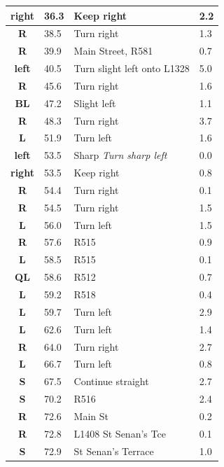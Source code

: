 \documentclass[11pt]{article}
\begin{document}
\begin{center}
\begin{supertabular}{|c|p{0.30in}|p{2.25in}|l|}
 \textbf{right} &  36.3 & Keep right &   2.2 \\ \hline
{} \textbf{R} &  38.5 & Turn right &   1.3 \\ \hline
{} \textbf{R} &  39.9 & Main Street, R581 &   0.7 \\ \hline
 \textbf{left} &  40.5 & Turn slight left onto L1328 &   5.0 \\ \hline
{} \textbf{R} &  45.6 & Turn right &   1.6 \\ \hline
 \textbf{BL} &  47.2 & Slight left &   1.1 \\ \hline
{} \textbf{R} &  48.3 & Turn right &   3.7 \\ \hline
 \textbf{L} &  51.9 & Turn left &   1.6 \\ \hline
 \textbf{left} &  53.5 & Sharp \newline \textit{Turn sharp left} &   0.0 \\ \hline
 \textbf{right} &  53.5 & Keep right &   0.8 \\ \hline
{} \textbf{R} &  54.4 & Turn right &   0.1 \\ \hline
{} \textbf{R} &  54.5 & Turn right &   1.5 \\ \hline
 \textbf{L} &  56.0 & Turn left &   1.5 \\ \hline
{} \textbf{R} &  57.6 & R515 &   0.9 \\ \hline
 \textbf{L} &  58.5 & R515 &   0.1 \\ \hline
 \textbf{QL} &  58.6 & R512 &   0.7 \\ \hline
 \textbf{L} &  59.2 & R518 &   0.4 \\ \hline
 \textbf{L} &  59.7 & Turn left &   2.9 \\ \hline
 \textbf{L} &  62.6 & Turn left &   1.4 \\ \hline
{} \textbf{R} &  64.0 & Turn right &   2.7 \\ \hline
 \textbf{L} &  66.7 & Turn left &   0.8 \\ \hline
 \textbf{S} &  67.5 & Continue straight &   2.7 \\ \hline
 \textbf{S} &  70.2 & R516 &   2.4 \\ \hline
{} \textbf{R} &  72.6 & Main St &   0.2 \\ \hline
{} \textbf{R} &  72.8 & L1408 St Senan's Tce &   0.1 \\ \hline
 \textbf{S} &  72.9 & St Senan's Terrace &   1.0 \\ \hline

\end{supertabular}
\end{center}
\end{document}
